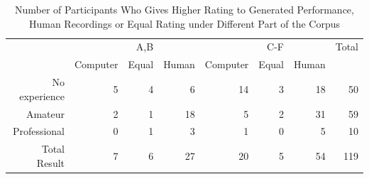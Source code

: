 \begin{table}
   \centering
   \caption{Number of Participants Who Gives Higher Rating to Generated Performance, Human Recordings or Equal Rating under Different Part of the Corpus}
   \label{tab:good-bad_count}
   \begin{tabular}{r|rrr|rrr|r}
\hline
&&A,B&&&C-F&&Total\\
&Computer&Equal&Human&Computer&Equal&Human&\\
      \hline
No experience&5&4&6&14&3&18&50\\
Amateur&2&1&18&5&2&31&59\\
Professional&0&1&3&1&0&5&10\\
      \hline
Total Result&7&6&27&20&5&54&119\\
      \hline
   \end{tabular}
\end{table}


